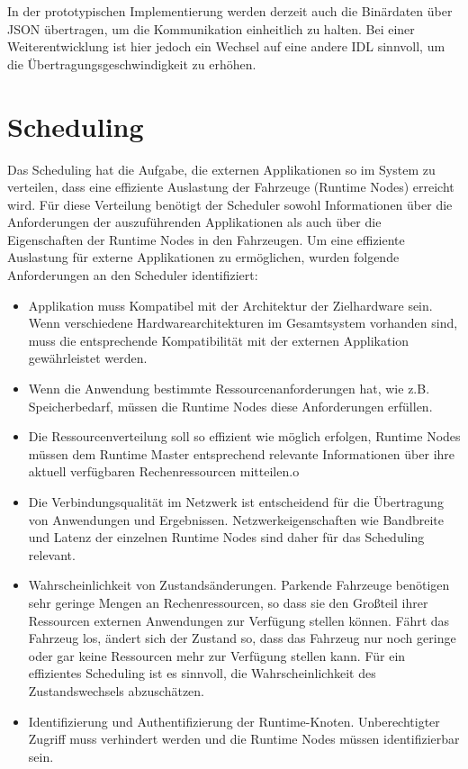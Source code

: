 In der prototypischen Implementierung werden derzeit auch die Binärdaten über \gls{JSON} übertragen, um die Kommunikation einheitlich zu halten. Bei einer Weiterentwicklung ist hier jedoch ein Wechsel auf eine andere \gls{IDL} sinnvoll, um die Übertragungsgeschwindigkeit zu erhöhen.

\section{Scheduling}

Das Scheduling hat die Aufgabe, die externen Applikationen so im System zu verteilen, dass eine effiziente Auslastung der Fahrzeuge (Runtime Nodes) erreicht wird. Für diese Verteilung benötigt der Scheduler sowohl Informationen über die Anforderungen der auszuführenden Applikationen als auch über die Eigenschaften der Runtime Nodes in den Fahrzeugen. Um eine effiziente Auslastung für externe Applikationen zu ermöglichen, wurden folgende Anforderungen an den Scheduler identifiziert:

\begin{itemize}
    \item Applikation muss Kompatibel mit der Architektur der Zielhardware sein. Wenn verschiedene Hardwarearchitekturen im Gesamtsystem vorhanden sind, muss die entsprechende Kompatibilität mit der externen Applikation gewährleistet werden. 
    \item Wenn die Anwendung bestimmte Ressourcenanforderungen hat, wie z.B. Speicherbedarf, müssen die Runtime Nodes diese Anforderungen erfüllen.
    \item Die Ressourcenverteilung soll so effizient wie möglich erfolgen, Runtime Nodes müssen dem Runtime Master entsprechend relevante Informationen über ihre aktuell verfügbaren Rechenressourcen mitteilen.o
    \item Die Verbindungsqualität im Netzwerk ist entscheidend für die Übertragung von Anwendungen und Ergebnissen. Netzwerkeigenschaften wie Bandbreite und Latenz der einzelnen Runtime Nodes sind daher für das Scheduling relevant.
    \item Wahrscheinlichkeit von Zustandsänderungen. Parkende Fahrzeuge benötigen sehr geringe Mengen an Rechenressourcen, so dass sie den Großteil ihrer Ressourcen externen Anwendungen zur Verfügung stellen können. Fährt das Fahrzeug los, ändert sich der Zustand so, dass das Fahrzeug nur noch geringe oder gar keine Ressourcen mehr zur Verfügung stellen kann. Für ein effizientes Scheduling ist es sinnvoll, die Wahrscheinlichkeit des Zustandswechsels abzuschätzen.
    \item Identifizierung und Authentifizierung der Runtime-Knoten. Unberechtigter Zugriff muss verhindert werden und die Runtime Nodes müssen identifizierbar sein.
\end{itemize}

